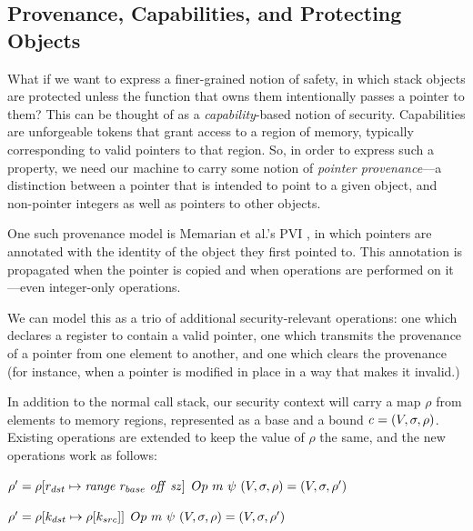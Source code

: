 \documentclass[10pt,conference]{ieeetran}%
\theoremstyle{definition}
\begin{document}





\appendix

\subsection{Provenance, Capabilities, and Protecting Objects}
\label{app:ptr}

What if we want to express a finer-grained notion of safety, in which
stack objects are protected unless the function that owns them intentionally
passes a pointer to them? This can be thought of as a {\it capability}-based
notion of security. Capabilities are unforgeable tokens that grant access to
a region of memory, typically corresponding to valid pointers to that region.
So, in order to express such a property, we need our machine to carry some notion
of {\it pointer provenance}---a distinction between a pointer that is intended to
point to a given object, and non-pointer integers as well as pointers to other objects.

One such provenance model is Memarian et al.'s PVI \cite{provenance}, in which pointers are
annotated with the identity of the object they first pointed to. This annotation is
propagated when the pointer is copied and when operations are performed on it---even
integer-only operations.

We can model this as a trio of additional security-relevant operations: one which
declares a register to contain a valid pointer, one which transmits the provenance
of a pointer from one element to another, and one which clears the provenance
(for instance, when a pointer is modified in place in a way that makes it invalid.)

In addition to the normal call stack, our security context will carry a map \(\rho\) from
elements to memory regions, represented as a base and a bound \(\mathit{c} = (V, \sigma, \rho)\).
Existing operations are extended to keep the value of \(\rho\) the same, and the new operations
work as follows:

           {\(\rho' = \rho[r_{dst} \mapsto \mathit{range} ~ r_{base} ~ \mathit{off} ~ \mathit{sz}]\)}
           {\(Op ~ m ~ \psi ~ (V,\sigma,\rho) = (V,\sigma,\rho')\)}

           {\(\rho' = \rho[k_{dst} \mapsto \rho[k_{src}]]\)}
           {\(Op ~ m ~ \psi ~ (V,\sigma,\rho) = (V,\sigma,\rho')\)}
\end{document}
